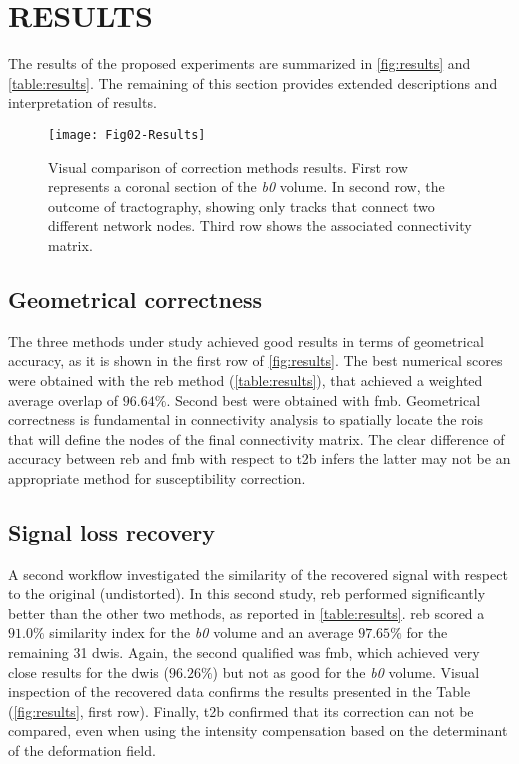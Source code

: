\section{RESULTS}
\label{sec:results}
The results of the proposed experiments are summarized
in \autoref{fig:results} and \autoref{table:results}.
The remaining of this section provides extended descriptions
and interpretation of results.



\begin{figure*}[tpb]
   \centering
   \texttt{[image: Fig02-Results]}
   \caption{Visual comparison of correction methods results. 
   First row represents
   a coronal section of the \textit{b0} volume. In second row, the outcome
   of tractography, showing only tracks that connect two different
   network nodes. Third row shows the associated connectivity matrix. }
   \label{fig:results}
\end{figure*}


\subsection{Geometrical correctness}

The three methods under study achieved good results in
terms of geometrical accuracy, as it is shown in the first
row of \autoref{fig:results}. The best numerical scores
were obtained with the \gls*{reb} method (\autoref{table:results}),
that achieved a weighted average overlap of $96.64\%$. Second
best were obtained with \gls*{fmb}. Geometrical correctness
is fundamental in connectivity analysis to spatially locate the
\glspl*{roi} that will define the nodes of the final connectivity
matrix. The clear difference of accuracy between \gls*{reb} and \gls*{fmb}
with respect to \gls*{t2b} infers the latter may not be
an appropriate method for susceptibility correction.

\subsection{Signal loss recovery}

A second workflow investigated the similarity of the recovered
signal with respect to the original (undistorted).
In this second study, \gls*{reb} performed significantly
better than the other two methods, as reported
in \autoref{table:results}. \gls*{reb} scored a $91.0\%$
similarity index for the \textit{b0} volume and an average $97.65\%$
for the remaining 31 \glspl*{dwi}. Again, the second
qualified was \gls*{fmb}, which achieved very close results
for the \glspl*{dwi} ($96.26\%$) but not as good for the \textit{b0}
volume. Visual inspection of the recovered data confirms the 
results presented in the Table (\autoref{fig:results}, first
row). Finally, \gls*{t2b} confirmed that its correction
can not be compared, even when using the intensity compensation
based on the determinant of the deformation field.


